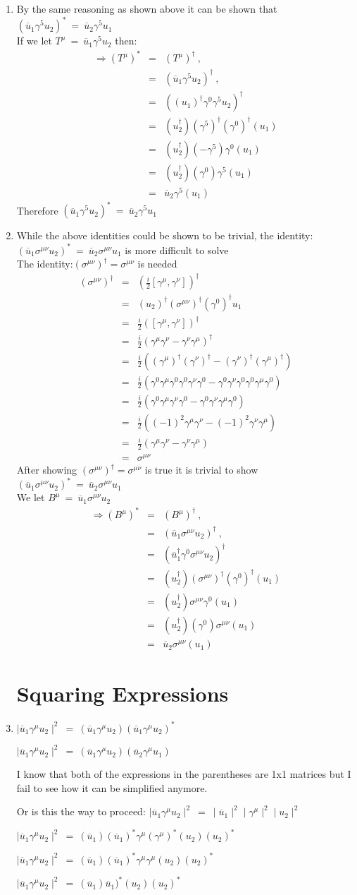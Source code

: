 \documentclass[12pt]{article}
\def \bea{\begin{eqnarray}}
\def \eea{\end{eqnarray}}
\def \nn{\nonumber}
\def \nl{\nn \\}
\def \ou{\overline{u}}
\def \ga{\gamma}
\def \si{\sigma}
\begin{document}
\begin{enumerate}
\item By the same reasoning as shown above it can be shown that $(\ou_1 \ga^5 u_2)^* ~=~ \ou_2 \ga^5 u_1$ \nl
If we let $T^\mu ~=~ \ou_1\ga^5 u_2$ then:
\bea
\Rightarrow (T^\mu)^* &=& (T^\mu)^\dag ~,~~ \nl
&=& (\ou_1\ga^5 u_2)^\dag ~,~~ \nl
&=& ((u_1)^\dag\ga^0\ga^5 u_2)^\dag \nl
&=& (u_2^\dag)(\ga^5)^\dag (\ga^0)^\dag(u_1)\nl
&=& (u_2^\dag)(-\ga^5) \ga^0(u_1)\nl
&=& (u_2^\dag)(\ga^0)\ga^5(u_1)\nl
&=& \ou_2\ga^5(u_1) \nonumber
\eea \nonumber 
Therefore  $(\ou_1 \ga^5 u_2)^* ~=~ \ou_2 \ga^5 u_1$

\item While the above identities could be shown to be trivial, the identity: $(\ou_1 \si^{\mu\nu} u_2)^* ~=~\ou_2 \si^{\mu\nu} u_1$ is more difficult to solve \nl 
The identity:$(\si^{\mu\nu})^\dag =\si^{\mu\nu}$ is needed 
\bea \nonumber
(\si^{\mu\nu})^\dag &=& (\frac{i}{2}[\ga^\mu,\ga^\nu])^\dag \nl
&=&(u_2)^\dag (\si^{\mu\nu})^\dag (\ga^0)^\dag u_1 \nl
&=& \frac{i}{2}([\ga^\mu,\ga^\nu])^\dag\nl
&=& \frac{i}{2}(\ga^\mu\ga^\nu-\ga^\nu\ga^\mu)^\dag \nl
&=& \frac{i}{2}((\ga^\mu)^\dag(\ga^\nu)^\dag-(\ga^\nu)^\dag(\ga^\mu)^\dag) \nl
&=& \frac{i}{2}(\ga^0\ga^\mu\ga^0\ga^0\ga^\nu\ga^0-\ga^0\ga^\nu\ga^0\ga^0\ga^\mu\ga^0)\nl
&=& \frac{i}{2}(\ga^0\ga^\mu\ga^\nu\ga^0-\ga^0\ga^\nu \ga^\mu\ga^0)\nl
&=& \frac{i}{2}((-1)^2\ga^\mu\ga^\nu-(-1)^2\ga^\nu \ga^\mu) \nl
&=& \frac{i}{2}(\ga^\mu\ga^\nu-\ga^\nu \ga^\mu)\nl
&=& \si^{\mu\nu}
\eea \nonumber
After showing $(\si^{\mu\nu})^\dag =\si^{\mu\nu}$ is true it is trivial to show $(\ou_1 \si^{\mu\nu} u_2)^* ~=~\ou_2 \si^{\mu\nu} u_1$ \nl
We let $B^\mu ~=~ \ou_1 \si^{\mu\nu} u_2$
\bea
\Rightarrow (B^\mu)^* &=& (B^\mu)^\dag ~,~~ \nl
&=& (\ou_1 \si^{\mu\nu} u_2)^\dag ~,~~ \nl
&=& (\ou_1^\dag \ga^0 \si^{\mu\nu} u_2)^\dag \nl
&=& (u_2^\dag)(\si^{\mu\nu})^\dag (\ga^0)^\dag(u_1)\nl
&=& (u_2^\dag)\si^{\mu\nu}\ga^0(u_1)\nl
&=& (u_2^\dag)(\ga^0)\si^{\mu\nu}(u_1)\nl
&=& \ou_2 \si^{\mu\nu}(u_1) \nonumber
\eea \nonumber 


\section{Squaring Expressions}
\item $\mid \ou_1 \ga^\mu u_2 \mid^2 ~=~ (\ou_1 \ga^\mu u_2)(\ou_1 \ga^\mu u_2 )^*$

$\mid \ou_1 \ga^\mu u_2 \mid^2 ~=~ (\ou_1 \ga^\mu u_2)(\ou_2 \ga^\mu u_1)$

I know that both of the expressions in the parentheses are 1x1 matrices but I fail to see how it can be simplified anymore.

Or is this the way to proceed:
$\mid \ou_1 \ga^\mu u_2 \mid^2 ~=~ \mid\ou_1\mid^2 \mid\ga^\mu\mid^2 \mid u_2 \mid^2$

$\mid \ou_1 \ga^\mu u_2 \mid^2 ~=~ (\ou_1)(\overline{u}_1)^*\ga^\mu (\ga^\mu)^* (u_2)(u_2)^*$

$\mid \ou_1 \ga^\mu u_2 \mid^2 ~=~ (\ou_1)(\ou_1)^*\ga^\mu \ga^\mu (u_2)(u_2)^*$

$\mid \ou_1 \ga^\mu u_2 \mid^2 ~=~ (\ou_1)\ou_1)^* (u_2)(u_2)^*$

\end{enumerate}
\end{document}
